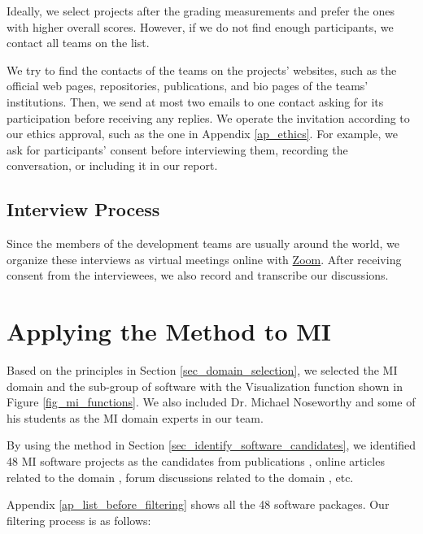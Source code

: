Ideally, we select projects after the grading measurements and prefer the ones with higher overall scores. However, if we do not find enough participants, we contact all teams on the list.

We try to find the contacts of the teams on the projects' websites, such as the official web pages, repositories, publications, and bio pages of the teams' institutions. Then, we send at most two emails to one contact asking for its participation before receiving any replies. We operate the invitation according to our ethics approval, such as the one in Appendix \ref{ap_ethics}. For example, we ask for participants' consent before interviewing them, recording the conversation, or including it in our report.

\subsection{Interview Process}
\label{sec_interview_process}
Since the members of the development teams are usually around the world, we organize these interviews as virtual meetings online with \hyperlink{https://zoom.us/}{Zoom}. After receiving consent from the interviewees, we also record and transcribe our discussions.

\section{Applying the Method to MI}
\label{sec_applying_method}

Based on the principles in Section \ref{sec_domain_selection}, we selected the MI domain and the sub-group of software with the Visualization function shown in Figure \ref{fig_mi_functions}. We also included Dr. Michael Noseworthy and some of his students as the MI domain experts in our team.

By using the method in Section \ref{sec_identify_software_candidates}, we identified 48 MI software projects as the candidates from publications \cite{Bjorn2017} \cite{Bruhschwein2019} \cite{Haak2015}, online articles related to the domain \cite{Emms2019} \cite{Hasan2020} \cite{Mu2019}, forum discussions related to the domain \cite{Samala2014}, etc.

Appendix \ref{ap_list_before_filtering} shows all the 48 software packages. Our filtering process is as follows:

